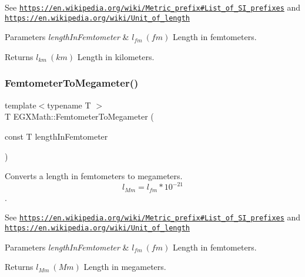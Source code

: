 See \href{https://en.wikipedia.org/wiki/Metric_prefix#List_of_SI_prefixes}{\tt https\+://en.\+wikipedia.\+org/wiki/\+Metric\+\_\+prefix\#\+List\+\_\+of\+\_\+\+S\+I\+\_\+prefixes} and \href{https://en.wikipedia.org/wiki/Unit_of_length}{\tt https\+://en.\+wikipedia.\+org/wiki/\+Unit\+\_\+of\+\_\+length} 
\begin{DoxyParams}{Parameters}
{\em length\+In\+Femtometer} & $ l_{fm}\ (fm)$ Length in femtometers. \\
\hline
\end{DoxyParams}
\begin{DoxyReturn}{Returns}
$ l_{km}\ (km)$ Length in kilometers. 
\end{DoxyReturn}
\mbox{\label{group___e_g_x_math-_conversions-_length_conversions-_femtometer-_s_i_gac6c32f00b8dbf147521bdcfeb39b57f2}} 
\subsubsection{\texorpdfstring{Femtometer\+To\+Megameter()}{FemtometerToMegameter()}}
{\footnotesize\ttfamily template$<$typename T $>$ \\
T E\+G\+X\+Math\+::\+Femtometer\+To\+Megameter (\begin{DoxyParamCaption}\item[{const T}]{length\+In\+Femtometer }\end{DoxyParamCaption})}



Converts a length in femtometers to megameters. \[ l_{Mm}=l_{fm} * 10^{-21} \]. 

See \href{https://en.wikipedia.org/wiki/Metric_prefix#List_of_SI_prefixes}{\tt https\+://en.\+wikipedia.\+org/wiki/\+Metric\+\_\+prefix\#\+List\+\_\+of\+\_\+\+S\+I\+\_\+prefixes} and \href{https://en.wikipedia.org/wiki/Unit_of_length}{\tt https\+://en.\+wikipedia.\+org/wiki/\+Unit\+\_\+of\+\_\+length} 
\begin{DoxyParams}{Parameters}
{\em length\+In\+Femtometer} & $ l_{fm}\ (fm)$ Length in femtometers. \\
\hline
\end{DoxyParams}
\begin{DoxyReturn}{Returns}
$ l_{Mm}\ (Mm)$ Length in megameters. 
\end{DoxyReturn}
\mbox{\label{group___e_g_x_math-_conversions-_length_conversions-_femtometer-_s_i_gad0ac4ef551ee703c8952fe04fbd90f78}} 
